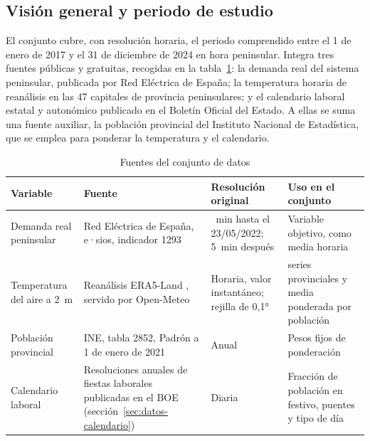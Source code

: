 \subsection{Visión general y periodo de estudio}\label{sec:datos-vision}

El conjunto cubre, con resolución horaria, el periodo comprendido entre el
1 de enero de 2017 y el 31 de diciembre de 2024 en hora peninsular. Integra
tres fuentes públicas y gratuitas, recogidas en la tabla~\ref{tab:fuentes}:
la demanda real del sistema peninsular, publicada por Red Eléctrica de
España; la temperatura horaria de reanálisis en las 47 capitales de
provincia peninsulares; y el calendario laboral estatal y autonómico
publicado en el Boletín Oficial del Estado. A ellas se suma una fuente
auxiliar, la población provincial del Instituto Nacional de Estadística, que
se emplea para ponderar la temperatura y el calendario.

\begin{table}[htbp]
	\centering
	\caption{Fuentes del conjunto de datos}
	\label{tab:fuentes}
	\small
	\begin{tabularx}{\textwidth}{>{\raggedright\arraybackslash}p{2.5cm} >{\raggedright\arraybackslash}X >{\raggedright\arraybackslash}p{2.8cm} >{\raggedright\arraybackslash}X}
		\hline
		\textbf{Variable} & \textbf{Fuente} & \textbf{Resolución original} & \textbf{Uso en el conjunto} \\
		\hline
		Demanda real peninsular & Red Eléctrica de España, e·sios, indicador 1293 \parencite{ree2026demandareal} & 10~min hasta el 23/05/2022; 5~min después & Variable objetivo, como media horaria \\
		Temperatura del aire a 2~m & Reanálisis ERA5-Land \parencite{munozsabater2021era5land}, servido por Open-Meteo \parencite{zippenfenig2023openmeteo} & Horaria, valor instantáneo; rejilla de 0,1° & 47 series provinciales y media ponderada por población \\
		Población provincial & INE, tabla 2852, Padrón a 1 de enero de 2021 \parencite{ine2021tabla2852} & Anual & Pesos fijos de ponderación \\
		Calendario laboral & Resoluciones anuales de fiestas laborales publicadas en el BOE (sección~\ref{sec:datos-calendario}) & Diaria & Fracción de población en festivo, puentes y tipo de día \\
		\hline
	\end{tabularx}
\end{table}

